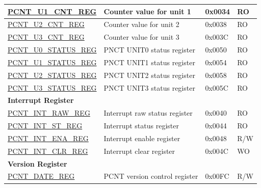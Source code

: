 \begin{longtable}{ | p{6cm} | p{7.2cm} | p{1.3cm} | p{1cm} | }
\hyperref[regdesc:PCNTUNCNTREG]{PCNT\_U1\_CNT\_REG} & Counter value for unit 1 & 0x0034 & RO \\ \hline
\hyperref[regdesc:PCNTUNCNTREG]{PCNT\_U2\_CNT\_REG} & Counter value for unit 2 & 0x0038 & RO \\ \hline
\hyperref[regdesc:PCNTUNCNTREG]{PCNT\_U3\_CNT\_REG} & Counter value for unit 3 & 0x003C & RO \\ \hline
\hyperref[regdesc:PCNTUNSTATUSREG]{PCNT\_U0\_STATUS\_REG} & PNCT UNIT0 status register & 0x0050 & RO \\ \hline
\hyperref[regdesc:PCNTUNSTATUSREG]{PCNT\_U1\_STATUS\_REG} & PNCT UNIT1 status register & 0x0054 & RO \\ \hline
\hyperref[regdesc:PCNTUNSTATUSREG]{PCNT\_U2\_STATUS\_REG} & PNCT UNIT2 status register & 0x0058 & RO \\ \hline
\hyperref[regdesc:PCNTUNSTATUSREG]{PCNT\_U3\_STATUS\_REG} & PNCT UNIT3 status register & 0x005C & RO \\ \hline
\multicolumn{4}{|l|}{\textbf{Interrupt Register}} \\ \hline
\hyperref[regdesc:PCNTINTRAWREG]{PCNT\_INT\_RAW\_REG} & Interrupt raw status register & 0x0040 & RO \\ \hline
\hyperref[regdesc:PCNTINTSTREG]{PCNT\_INT\_ST\_REG} & Interrupt status register & 0x0044 & RO \\ \hline
\hyperref[regdesc:PCNTINTENAREG]{PCNT\_INT\_ENA\_REG} & Interrupt enable register & 0x0048 & R/W \\ \hline
\hyperref[regdesc:PCNTINTCLRREG]{PCNT\_INT\_CLR\_REG} & Interrupt clear register & 0x004C & WO \\ \hline
\multicolumn{4}{|l|}{\textbf{Version Register}} \\ \hline
\hyperref[regdesc:PCNTDATEREG]{PCNT\_DATE\_REG} & PCNT version control register & 0x00FC & R/W \\ \hline
\end{longtable}

